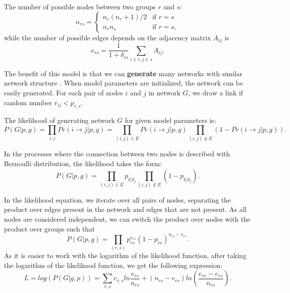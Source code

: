 The number of possible nodes between two groups $r$ and $s$:
\begin{equation}
n_{rs} = \begin{cases}
n_r(n_{r}+1)/2 &\text{if  } r=s \\
n_rn_s &\text{if  } r=s,
\end{cases}
\end{equation}
while the number of possible edges depends on the adjacency matrix $A_{ij}$ is
\begin{equation}
e_{rs}=\frac{1}{1+\delta_{rs}}\sum_{i \in r, j\in s} A_{ij}.
\end{equation}

The benefit of this model is that we can \textbf{generate} many networks with similar network structure \cite{rosvall2019different}. When model parameters are initialized, the network can be easily generated. For each pair of nodes $i$ and $j$ in network $G$, we draw a link if random number $r_{ij}<p_{r, s}$. 

The likelihood of generating network $G$ for given model parameters is:
\begin{equation}
P(G|p, g) = \prod_{i,j} Pr(i \rightarrow j| p, g) = \prod_{(i,j)\in E} Pr(i \rightarrow j| p, g)\prod_{(i,j)\notin E} ( 1 - Pr(i \rightarrow j| p, g)).
\end{equation}

In the processes where the connection between two nodes is described with Bernoulli distribution, the likelihood takes the form:
\begin{equation}
P(G|p, g) = \prod_{(i,j)\in E} p_{g_ig_j}\prod_{(i,j)\notin E} ( 1 - p_{g_ig_j}).
\end{equation}

In the likelihood equation, we iterate over all pairs of nodes, separating the product over edges present in the network and edges that are not present.  
As all nodes are considered independent, we can switch the product over nodes with the product over groups such that
\begin{equation}
P(G|p, g) = \prod_{(r,s)} p_{rs}^{e_{rs}}(1-p_{rs})^{n_{rs}-e_{rs}}.
\end{equation}
As it is easier to work with the logarithm of the likelihood function, after taking the logarithm of the likelihood function, we get the following expression:
\begin{equation}
L = log(P(G|g, p)) = \sum_{r,s} e_{r,s} ln\frac{e_{rs}}{n_{rs}} + (n_{rs}-e_{rs})ln(\frac{e_{rs}-e_{rs}}{n_{rs}}).
\end{equation}

